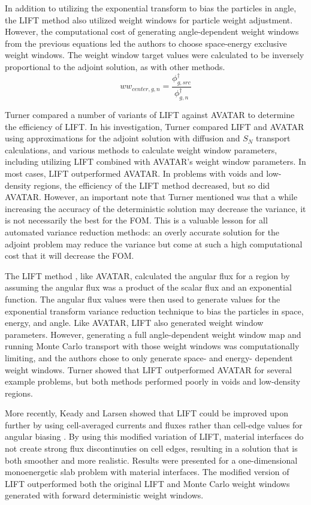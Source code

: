 In addition to utilizing the exponential transform to bias the particles in
angle, the LIFT
method also utilized weight windows for particle weight adjustment. However, the
computational
cost of generating angle-dependent weight windows from the previous equations
led the authors
to choose space-energy exclusive weight windows. The weight window target values were
calculated to be inversely proportional to the adjoint solution, as with other
methods.
\begin{equation}
  ww_{center,g,n} = \frac{\phi^{\dagger}_{g,src}}{\phi^{\dagger}_{g,n}}
\end{equation}

Turner compared a number of variants of LIFT \cite{turner_automatic_1997-1}
against AVATAR to
determine the efficiency of LIFT. In his investigation, Turner compared LIFT and
AVATAR using
approximations for the adjoint solution with diffusion and $S_N$ transport
calculations, and
various methods to calculate weight window parameters, including utilizing LIFT
combined
with AVATAR's weight window parameters. In most cases, LIFT outperformed AVATAR.
In problems
with voids and low-density regions, the efficiency of the LIFT method decreased,
but so did
AVATAR. However, an important note that Turner mentioned was that a while
increasing the
accuracy of the deterministic solution may decrease the variance, it is not
necessarily the
best for the FOM. This is a valuable lesson for all automated variance reduction
methods: an
overly accurate solution for the adjoint problem may reduce the variance but
come at such
a high computational cost that it will decrease the FOM.

The LIFT method \cite{turner_automatic_1997, turner_automatic_1997-1}, like
AVATAR, calculated the angular flux for a region by assuming the angular flux
was a product of the scalar flux and an exponential function. The angular flux
values were then used to generate values for the exponential transform variance
reduction
technique to bias the particles in space, energy, and angle. Like AVATAR, LIFT
also generated weight window parameters. However, generating a full
angle-dependent weight window map and running Monte Carlo transport with those
weight windows was computationally limiting, and the authors chose to only
generate space- and energy- dependent weight windows. Turner showed that LIFT
outperformed AVATAR for several example problems, but both methods performed
poorly in voids and low-density regions.

More recently, Keady and Larsen showed that LIFT could be improved upon further
by using cell-averaged currents and fluxes rather than cell-edge values for
angular biasing \cite{keady_modified_2015}. By using this modified variation of
LIFT, material interfaces do not create strong flux discontinuties on cell
edges, resulting in a solution that is both smoother and more realistic.
Results were presented for a
one-dimensional monoenergetic slab problem with material interfaces. The
modified version of LIFT outperformed both the original LIFT and Monte Carlo
weight windows generated with forward deterministic weight windows.


